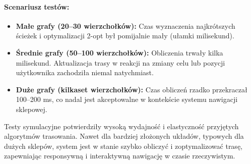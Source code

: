 \paragraph{Scenariusz testów:} 
\begin{itemize}
    \item \textbf{Małe grafy (20--30 wierzchołków):} Czas wyznaczenia najkrótszych ścieżek i optymalizacji 2-opt był pomijalnie mały (ułamki milisekund).
    \item \textbf{Średnie grafy (50--100 wierzchołków):} Obliczenia trwały kilka milisekund. Aktualizacja trasy w reakcji na zmiany celu lub pozycji użytkownika zachodziła niemal natychmiast.
    \item \textbf{Duże grafy (kilkaset wierzchołków):} Czas obliczeń rzadko przekraczał 100--200 ms, co nadal jest akceptowalne w kontekście systemu nawigacji sklepowej.
\end{itemize}

Testy symulacyjne potwierdziły wysoką wydajność i elastyczność przyjętych algorytmów trasowania. Nawet dla bardziej złożonych układów, typowych dla dużych sklepów, system jest w stanie szybko obliczyć i zoptymalizować trasę, zapewniając responsywną i interaktywną nawigację w czasie rzeczywistym.
